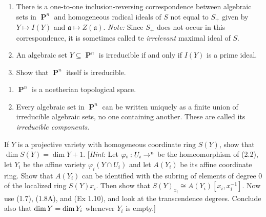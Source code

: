\documentclass{hw_pset} %
\DeclareMathOperator{\Dim}{\rm{dim}}  %
\let\aa\relax
\DeclareMathOperator{\aa}{\mathbf{A}} %
\DeclareMathOperator{\pp}{\mathbf{P}} %
\renewcommand{\phi}{\varphi}
\begin{document}
\begin{exercise}[Exercise 2.4]
    \begin{enumerate}
        \item There is a one-to-one inclusion-reversing correspondence between
        algebraic sets in $\pp^n$ and homogeneous radical ideals of $S$ not equal
        to $S_+$ given by $Y \mapsto I(Y)$ and $\mathfrak{a} \mapsto
        Z(\mathfrak{a})$. \emph{Note:} Since $S_{+}$ does not occur in this correspondence, 
        it is sometimes called te \emph{irrelevant} maximal ideal of $S$. 
        
        \item An algebraic set $Y \subseteq \pp^n$ is irreducible if and only if $I(Y)$ is a prime ideal. 
        \item Show that $\pp^n$ itself is irreducible. 
    \end{enumerate}
\end{exercise}

\begin{solution}

\end{solution}

\begin{exercise}[Exercise 2.5]
    \begin{enumerate}
        \item $\pp^n$ is a noetherian topological space. 
        \item Every algebraic set in $\pp^n$ can be written uniquely as a finite
          union of irreducible algebraic sets, no one containing another. These are
          called its \emph{irreducible components}. 
    \end{enumerate}
\end{exercise}

\begin{solution}

\end{solution}

\begin{exercise}[2.6]
    If $Y$ is a projective variety with homogeneous coordinate ring $S(Y)$, show that $\dim S(Y) = \dim Y + 1$. 
    [\emph{Hint}: Let $\phi_i: U_i \to \aa^n$ be the homeomorphism of (2.2), 
    let $Y_i$ be the affine variety $\phi_i(Y \cap U_i)$ and let $A(Y_i)$ be its affine coordinate ring.
    Show that $A(Y_i)$ can be identified with the subring of elements of degree 0 of the 
    localized ring $S(Y)x_i$. Then show that $S(Y)_{x_i} \cong A(Y_i)[x_i, x_i^{-1}]$. 
    Now use (1.7), (1.8A), and (Ex 1.10), and look at the transcendence degrees. Conclude also that 
    $\Dim Y = \Dim Y_i$ whenever $Y_i$ is empty.]
\end{exercise}
\end{document}
